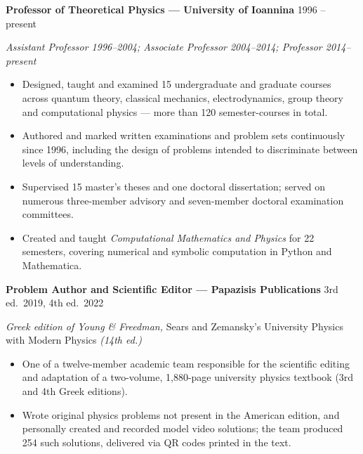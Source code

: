 \documentclass[a4paper,10.5pt]{article}
\newcommand{\jobline}[2]{\textbf{#1} \hfill #2\par\vspace{1pt}}
\begin{document}
\jobline{Professor of Theoretical Physics --- University of Ioannina}{1996 -- present}
\textit{Assistant Professor 1996--2004; Associate Professor 2004--2014;
Professor 2014--present}
\begin{itemize}
\item Designed, taught and examined 15 undergraduate and graduate courses
  across quantum theory, classical mechanics, electrodynamics, group
  theory and computational physics --- more than 120 semester-courses in
  total.
\item Authored and marked written examinations and problem sets
  continuously since 1996, including the design of problems
  intended to discriminate between levels of understanding.
\item Supervised 15 master's theses and one doctoral dissertation; served
  on numerous three-member advisory and seven-member doctoral
  examination committees.
\item Created and taught \textit{Computational Mathematics and Physics}
  for 22 semesters, covering numerical and symbolic computation in
  Python and Mathematica.
\end{itemize}

\vspace{5pt}
\jobline{Problem Author and Scientific Editor --- Papazisis Publications}{3rd ed.\ 2019, 4th ed.\ 2022}
\textit{Greek edition of Young \& Freedman,} Sears and Zemansky's
University Physics with Modern Physics \textit{(14th ed.)}
\begin{itemize}
\item One of a twelve-member academic team responsible for the scientific
  editing and adaptation of a two-volume, 1{,}880-page university physics
  textbook (3rd and 4th Greek editions).
\item Wrote original physics problems not present in the American edition,
  and personally created and recorded model video solutions; the team
  produced 254 such solutions, delivered via QR codes printed in the text.
\end{itemize}
\end{document}

